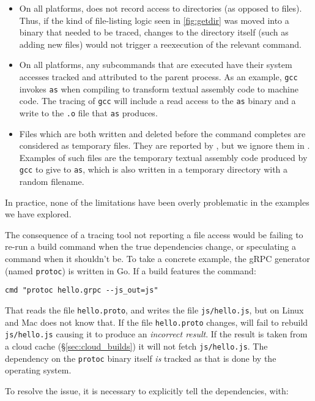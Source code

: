 \begin{itemize}
\item On all platforms, \Fsatrace does not record access to directories (as opposed to files). Thus, if the kind of file-listing logic seen in \ref{fig:getdir} was moved into a binary that needed to be traced, changes to the directory itself (such as adding new files) would not trigger a reexecution of the relevant command.
\item On all platforms, any subcommands that are executed have their system accesses tracked and attributed to the parent process. As an example, \texttt{gcc} invokes \texttt{as} when compiling to transform textual assembly code to machine code. The tracing of \texttt{gcc} will include a read access to the \texttt{as} binary and a write to the \texttt{.o} file that \texttt{as} produces.
\item Files which are both written and deleted before the command completes are considered as temporary files. They are reported by \Fsatrace, but we ignore them in \Rattle. Examples of such files are the temporary textual assembly code produced by \texttt{gcc} to give to \texttt{as}, which is also written in a temporary directory with a random filename.
\end{itemize}

\noindent In practice, none of the limitations have been overly problematic in the examples we have explored.

The consequence of a tracing tool not reporting a file access would be failing to re-run a build command when the true dependencies change, or speculating a command when it shouldn't be. To take a concrete example, the gRPC generator (named \texttt{protoc}) is written in Go. If a \Rattle build features the command:

\begin{verbatim}
cmd "protoc hello.grpc --js_out=js"
\end{verbatim}

That reads the file \texttt{hello.proto}, and writes the file \texttt{js/hello.js}, but on Linux and Mac \Rattle does not know that. If the file \texttt{hello.proto} changes, \Rattle will fail to rebuild \texttt{js/hello.js} causing it to produce an \emph{incorrect result}. If the result is taken from a cloud cache (\S\ref{sec:cloud_builds}) it will not fetch \texttt{js/hello.js}. The dependency on the \texttt{protoc} binary itself \emph{is} tracked as that is done by the operating system.

To resolve the issue, it is necessary to explicitly tell \Rattle the dependencies, with:

